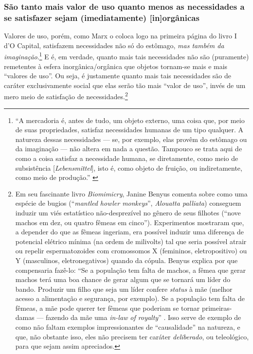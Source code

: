 \subsubsection{São tanto mais valor de uso quanto menos as necessidades a se satisfazer sejam (imediatamente) [in]orgânicas}
Valores de uso, porém, como Marx o coloca logo na primeira página do livro I d'O Capital, satisfazem necessidades não só do estômago, \textit{mas também da imaginação}.\footnote{``A mercadoria é, antes de tudo, um objeto externo, uma coisa que, por meio de suas propriedades, satisfaz necessidades humanas de um tipo qualquer. A natureza dessas necessidades — se, por exemplo, elas provêm do estômago ou da imaginação — não altera em nada a questão. Tampouco se trata aqui de como a coisa satisfaz a necessidade humana, se diretamente, como meio de subsistência [\textit{Lebensmittel}], isto é, como objeto de fruição, ou indiretamente, como meio de produção.'' \parencite[p. 113]{Marx2017}} E é, em verdade, quanto mais tais necessidades não são (puramente) remetentes à esfera inorgânica/orgânica que objetos tornam-se mais e mais ``valores de uso''. Ou seja, é justamente quanto mais tais necessidades são de caráter exclusivamente social que elas serão tão mais ``valor de uso'', invés de um mero meio de satisfação de necessidades.\footnote{Em seu fascinante livro \textit{Biomimicry}, Janine Benyus comenta sobre como uma espécie de bugios (``\textit{mantled howler monkeys}'', \textit{Alouatta palliata}) conseguem induzir um viés estatístico não-desprezível no gênero de seus filhotes (``nove machos em dez, ou quatro fêmeas em cinco''). Experimentos mostraram que, a depender do que as fêmeas ingeriam, era possível induzir uma diferença de potencial elétrico mínima (na ordem de milivolts) tal que seria possível atrair ou repelir espermatozoides com cromossomos X (femininos, eletropositivo) ou Y (masculinos, eletronegativos) quando da cópula. Benyus explica por que compensaria fazê-lo: ``Se a população tem falta de machos, a fêmea que gerar machos terá uma boa chance de gerar algum que se tornará um líder do bando. Produzir um filho que seja um líder confere \textit{status} à mãe (melhor acesso a alimentação e segurança, por exemplo). Se a população tem falta de fêmeas, a mãe pode querer ter fêmeas que poderiam se tornar primeiras-damas — fazendo da mãe uma \textit{in-law of royalty}'' \parencite[p. 171]{Benyus2009}. Isso serve de exemplo de como não faltam exemplos impressionantes de ``causalidade'' na natureza, e que, não obstante isso, eles não precisem ter caráter \textit{deliberado}, ou teleológico, para que sejam assim apreciados.}

